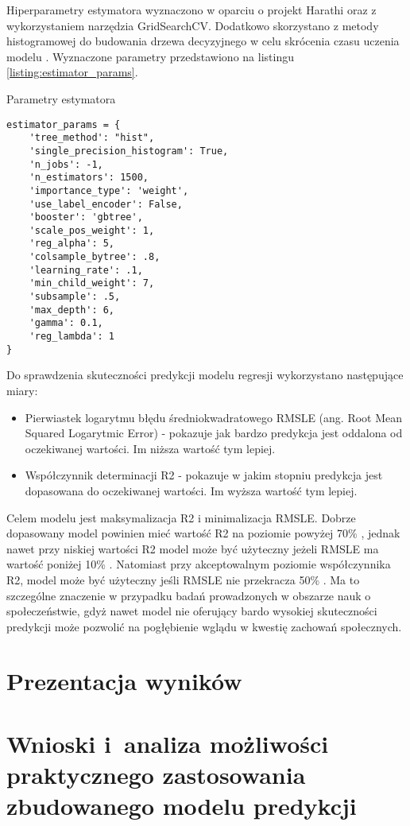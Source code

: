 Hiperparametry estymatora wyznaczono w oparciu o projekt Harathi \cite{harathi-2018} oraz z wykorzystaniem narzędzia GridSearchCV.
Dodatkowo skorzystano z metody histogramowej do budowania drzewa decyzyjnego w celu skrócenia czasu uczenia modelu \cite{golarnyk-2021}.
Wyznaczone parametry przedstawiono na listingu \ref{listing:estimator_params}.

\begin{listing}[h!]
    \caption{Parametry estymatora} \label{listing:estimator_params}
    \begin{verbatim}
estimator_params = {
    'tree_method': "hist",
    'single_precision_histogram': True,
    'n_jobs': -1,
    'n_estimators': 1500,
    'importance_type': 'weight',
    'use_label_encoder': False,
    'booster': 'gbtree',
    'scale_pos_weight': 1,
    'reg_alpha': 5,
    'colsample_bytree': .8,
    'learning_rate': .1,
    'min_child_weight': 7,
    'subsample': .5,
    'max_depth': 6,
    'gamma': 0.1,
    'reg_lambda': 1
}
    \end{verbatim}
    \raggedright\source{\ownwork}
\end{listing}

Do sprawdzenia skuteczności predykcji modelu regresji wykorzystano następujące miary:
\begin{itemize}
    \item Pierwiastek logarytmu błędu średniokwadratowego RMSLE (ang. Root Mean Squared Logarytmic Error) - pokazuje jak bardzo predykcja jest oddalona od oczekiwanej wartości. Im niższa wartość tym lepiej.
    \item Współczynnik determinacji R2 - pokazuje w jakim stopniu predykcja jest dopasowana do oczekiwanej wartości. Im wyższa wartość tym lepiej.
    \end{itemize}

Celem modelu jest maksymalizacja R2 i minimalizacja RMSLE. Dobrze dopasowany model powinien mieć wartość R2 na poziomie powyżej 70\% \cite{r2-good-value}, jednak nawet przy niskiej wartości R2 model może być użyteczny jeżeli RMSLE ma wartość poniżej 10\% \cite{r2-vs-rmse}.
Natomiast przy akceptowalnym poziomie współczynnika R2, model może być użyteczny jeśli RMSLE nie przekracza 50\% \cite{rmse-good-value}.
Ma to szczególne znaczenie w przypadku badań prowadzonych w obszarze nauk o społeczeństwie, gdyż nawet model nie oferujący bardo wysokiej skuteczności predykcji może pozwolić na pogłębienie wglądu w kwestię zachowań społecznych.

\section{Prezentacja wyników}\label{sec:analysis:important-features}
\todo{}
\section{Wnioski i~analiza możliwości praktycznego zastosowania zbudowanego modelu predykcji}\label{sec:analysis:model-fitness}

\thispagestyle{normal}
